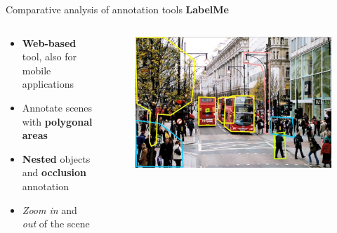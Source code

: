 \documentclass{beamer}
\begin{document}
\begin{tframe}{Comparative analysis of annotation tools}
\textbf{LabelMe} 
\begin{columns}[t] %
\begin{column}{.5\textwidth}
\begin{itemize}
\item \textbf{Web-based} tool, also for mobile applications
\vspace{0.2cm}
\item Annotate scenes with \textbf{polygonal areas}
\vspace{0.2cm}
\item \textbf{Nested} objects and \textbf{occlusion} annotation
\vspace{0.2cm}
\item \emph{Zoom in} and \emph{out} of the scene
\end{itemize}
\end{column}%
\begin{column}{.3\textwidth}
\begin{figure}[h]
\centering
\includegraphics[scale=0.15]{images/labelme.jpg}
\end{figure}
\end{column}%
\end{columns}
\end{tframe}
\end{document}
